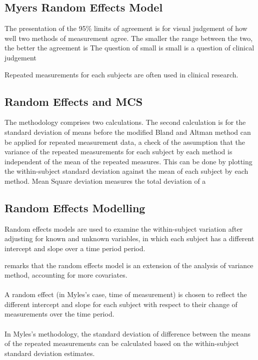 \documentclass[12pt, a4paper]{report}
\theoremstyle{plain}
\theoremstyle{definition}
\theoremstyle{remark}
\begin{document}
\subsection{Myers Random Effects Model} The presentation of the
95\% limits of agreement is for visual judgement of how well two
methods of measurement agree. The smaller the range between the
two, the better the agreement is The question of small is small is
a question of clinical judgement


Repeated measurements for each subjects are often used in clinical
research.


\subsection{Random Effects and MCS}
The methodology comprises two calculations. The second calculation
is for the standard deviation of means before the modified Bland
and Altman method can be applied for repeated measurement data, a check of the assumption that the variance of the repeated
measurements for each subject by each method is independent of the mean of the repeated measures. This can be done by plotting the
within-subject standard deviation against the mean of each subject by each method. Mean Square deviation measures the total deviation
of a

\subsection{Random Effects Modelling}
Random effects models are used to examine the within-subject
variation after adjusting for known and unknown variables, in
which each subject has a different intercept and slope over a time
period period.


\citet{Myles} remarks that the random effects model is an
extension of the analysis of variance method, accounting for more
covariates.
\\
\\
A random effect (in Myles's case, time of measurement) is chosen
to reflect the different intercept and slope for each subject with
respect to their change of measurements over the time period.
\\
\\
In Myles's methodology, the standard deviation of difference
between the means of the repeated measurements can be calculated
based on the within-subject standard deviation estimates.
\end{document}
